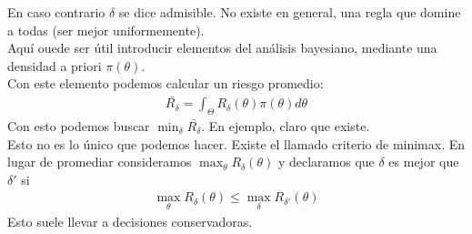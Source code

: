 \documentclass[10pt]{article}
\theoremstyle{plain}
\theoremstyle{definition}
\begin{document}
En caso contrario $\delta$ se dice admisible. No existe en general, una regla que domine a todas (ser mejor uniformemente).\\

Aquí ouede ser útil introducir elementos del análisis bayesiano, mediante una densidad a priori $\pi (\theta)$.\\
Con este elemento podemos calcular un riesgo promedio:
\begin{align*}
\bar{R_{\delta}} = \int_{\Theta} R_{\delta}(\theta) \pi(\theta) d\theta
\end{align*}
Con esto podemos buscar $\min_{\delta} \bar{R_{\delta}}$. En ejemplo, claro que existe.\\

Esto no es lo único que podemos hacer. Existe el llamado criterio de minimax. En lugar de promediar consideramos $\max_{\theta}R_{\delta}(\theta)$ y declaramos que $\delta$ es mejor que $\delta'$ si
\begin{align*}
\max_{\theta} R_{\delta}(\theta) \le \max_{\delta} R_{\delta'}(\theta)
\end{align*}
Esto suele llevar a decisiones conservadoras.
\end{document}
